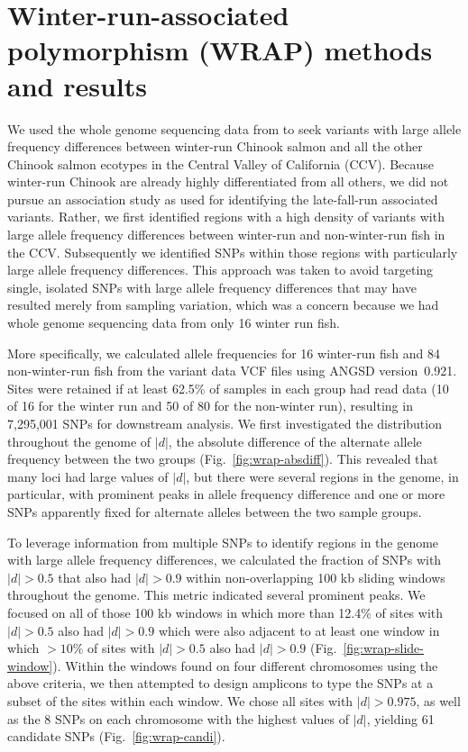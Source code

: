 
\section{Winter-run-associated polymorphism (WRAP) methods and results\label{sec:wrap-methods}}

We used the whole genome sequencing data from \citet{thompson2020complex} to seek variants with
large allele frequency differences between winter-run Chinook salmon and all the other
Chinook salmon ecotypes in the Central Valley of California (CCV).  Because winter-run Chinook are
already highly differentiated from all others, we did not pursue an association study as used
for identifying the late-fall-run associated variants.  Rather, we first identified regions with a high
density of variants with large allele frequency differences between winter-run and non-winter-run
fish in the CCV\@. Subsequently we identified SNPs within those regions with particularly
large allele frequency differences.  This approach was taken to avoid targeting single, isolated SNPs
with large allele frequency differences that may have resulted merely from sampling variation, which was a
concern because we had whole genome sequencing data from only 16 winter run fish.

More specifically, we calculated allele frequencies for 16 winter-run fish and 84 non-winter-run
fish from the  \citet{thompson2020complex} variant data VCF files using ANGSD version~0.921.
Sites were retained if at least 62.5\% of samples in each group had read data (10 of 16 for the
winter run and 50 of 80 for the non-winter run), resulting in 7,295,001 SNPs for downstream
analysis.  We first investigated the distribution throughout the genome of $|d|$, the absolute difference
of the alternate allele frequency between the two groups  (Fig.~\ref{fig:wrap-absdiff}). This revealed
that many loci had large values of $|d|$, but there were several
regions in the genome, in particular, with prominent peaks in allele frequency difference and one
or more SNPs apparently fixed for alternate alleles between the two sample groups.  

To leverage information from multiple SNPs to identify regions in the genome with large
allele frequency differences, we calculated the fraction of SNPs with $|d| > 0.5$ that also
had $|d| > 0.9$ within non-overlapping 100 kb sliding windows throughout the genome. This metric indicated
several prominent peaks.  We focused on all of those
100 kb windows in which more than 12.4\% of sites with $|d|>0.5$ also had $|d|>0.9$ which were
also adjacent to at least one window in which $>10\%$ of sites with $|d|>0.5$ also had $|d|>0.9$ 
(Fig.~\ref{fig:wrap-slide-window}).  Within the windows found on four different chromosomes using
the above criteria, we then attempted to design amplicons to type the SNPs at a subset of the sites
within each window.  We chose all sites with $|d|>0.975$, as well as the 8 SNPs on each chromosome
with the highest values of $|d|$, yielding 61 candidate SNPs (Fig.~\ref{fig:wrap-candi}).  

